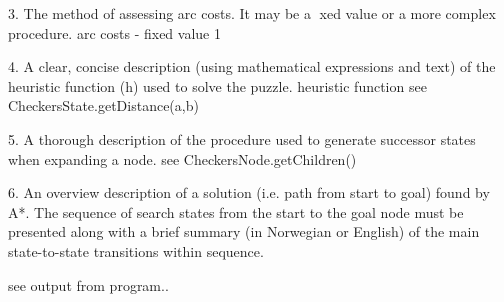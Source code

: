 \documentclass{article}
\begin{document}
3. The method of assessing arc costs. It may be a xed value or a more complex procedure.
arc costs - fixed value 1

4. A clear, concise description (using mathematical expressions and text) of the heuristic function (h)
used to solve the puzzle.
heuristic function see CheckersState.getDistance(a,b)

5. A thorough description of the procedure used to generate successor states when expanding a node.
see CheckersNode.getChildren()

6. An overview description of a solution (i.e. path from start to goal) found by A*. The sequence of search
states from the start to the goal node must be presented along with a brief summary (in Norwegian or
English) of the main state-to-state transitions within sequence.

see output from program..
\end{document}
